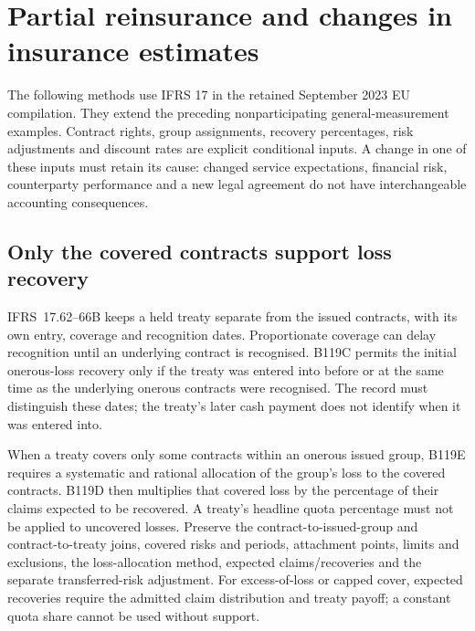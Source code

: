 \hypertarget{partial-reinsurance-and-changes-in-insurance-estimates}{%
\section{Partial reinsurance and changes in insurance estimates}\label{partial-reinsurance-and-changes-in-insurance-estimates}}

The following methods use IFRS 17 in the retained September 2023 EU compilation. They extend the preceding nonparticipating general-measurement examples. Contract rights, group assignments, recovery percentages, risk adjustments and discount rates are explicit conditional inputs. A change in one of these inputs must retain its cause: changed service expectations, financial risk, counterparty performance and a new legal agreement do not have interchangeable accounting consequences.

\hypertarget{only-the-covered-contracts-support-loss-recovery}{%
\subsection{Only the covered contracts support loss recovery}\label{only-the-covered-contracts-support-loss-recovery}}

IFRS~17.62--66B \citep[IFRS~17.62--68 and B119C--F]{eu20231803} keeps a held treaty separate from the issued contracts, with its own entry, coverage and recognition dates. Proportionate coverage can delay recognition until an underlying contract is recognised. B119C permits the initial onerous-loss recovery only if the treaty was entered into before or at the same time as the underlying onerous contracts were recognised. The record must distinguish these dates; the treaty's later cash payment does not identify when it was entered into.

When a treaty covers only some contracts within an onerous issued group, B119E requires a systematic and rational allocation of the group's loss to the covered contracts. B119D then multiplies that covered loss by the percentage of their claims expected to be recovered. A treaty's headline quota percentage must not be applied to uncovered losses. Preserve the contract-to-issued-group and contract-to-treaty joins, covered risks and periods, attachment points, limits and exclusions, the loss-allocation method, expected claims/recoveries and the separate transferred-risk adjustment. For excess-of-loss or capped cover, expected recoveries require the admitted claim distribution and treaty payoff; a constant quota share cannot be used without support.

